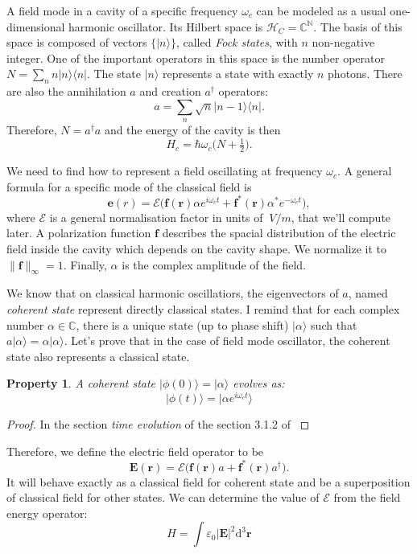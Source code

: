 \documentclass[10pt,a4paper]{report}
\theoremstyle{plain}
\newtheorem{prop}[thm]{Property}
\theoremstyle{definition}
\theoremstyle{remark}
\newcommand{\N}{\ensuremath{\mathbb{N}}}
\newcommand{\C}{\ensuremath{\mathbb{C}}}
\newcommand{\ket}[1]{|#1\rangle}
\newcommand{\bra}[1]{\langle#1|}
\newcommand{\dd}{\mathrm{d}}
\newcommand{\bs}{\boldsymbol}
\begin{document}
A field mode in a cavity of a specific frequency $\omega_c$ can be modeled
as a usual one-dimensional harmonic oscillator. Its Hilbert space is
$\mathcal{H}_C = \C^\N$.
The basis of this space is composed of vectors $\{\ket n\}$, called \emph{Fock states}, with $n$ non-negative integer. One of the important operators in this space is the
number operator $N = \sum_n n\ket n \bra n$. The state $\ket n$ represents a
state with exactly $n$ photons. There are also the annihilation $a$ and creation $a^\dagger$ operators:
\[a = \sum_n \sqrt{n} \ket {n-1} \bra{n}.\]
Therefore, $N = a^\dagger a$ and the energy of the cavity is then
\[H_c = \hbar \omega_c \big(N + \tfrac 12\big).\]

We need to find how to represent a field oscillating at frequency $\omega_c$.
A general formula for a specific mode of the classical field is
\[\bs e(r) = \mathcal{E}\big(\bs f(\bs r) \alpha e^{i\omega_c t} + \bs f^*(\bs r)
  \alpha^* e^{-\omega_c t}\big),\]
where $\mathcal{E}$ is a general normalisation factor in units of $\SI{}{V/m}$, that
we'll compute later. A polarization function  $\bs f$
describes the spacial distribution of the electric field inside the cavity which
depends on the cavity shape.
We normalize it to $\|\bs f\|_\infty = 1$. Finally, $\alpha$ is the complex amplitude
of the field.

We know that on classical harmonic oscillatiors, the eigenvectors of $a$, named
\emph{coherent state} represent directly classical states. I remind that for
each complex number $\alpha \in \C$, there is a unique state (up to phase shift)
$\ket \alpha$ such that $a \ket \alpha = \alpha \ket \alpha$.
Let's prove that in the case of field mode oscillator, the coherent state also
represents a classical state.

\begin{prop}
  A coherent state $\ket{\phi(0)} = \ket \alpha$ evolves as:
  \[ \ket {\phi(t)} = \ket {\alpha e^{i\omega_c t}} \]
\end{prop}

\begin{proof}
  In the section \emph{time evolution} of the section 3.1.2 of \cite{Har06}
\end{proof}

Therefore, we define the electric field operator to be
\begin{equation}\label{eqn:Eop}
\bs E(\bs r) = \mathcal{E}\big(\bs f(\bs r) a + \bs f^*(\bs r)
  a^\dagger \big).
\end{equation}
It will behave exactly as a classical field for coherent state and be a
superposition of classical field for other states. We can determine the value of
$\mathcal{E}$ from the field energy operator:
\[ H = \int \varepsilon_0 |{\bs E}|^2 \dd^3 \bs r \]
\end{document}
